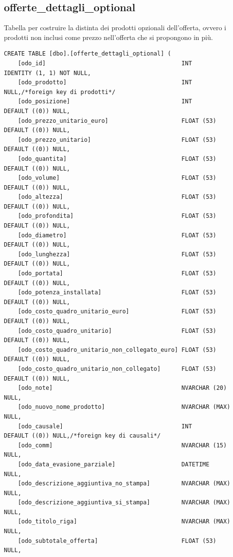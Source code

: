 \documentclass[12pt]{article}
\begin{document}
\subsection{offerte\_dettagli\_optional}
Tabella per costruire la distinta dei prodotti opzionali dell'offerta,
ovvero i prodotti non inclusi come prezzo nell'offerta che si propongono in più.
\begin{lstlisting}
CREATE TABLE [dbo].[offerte_dettagli_optional] (
    [odo_id]                                       INT            IDENTITY (1, 1) NOT NULL,
    [odo_prodotto]                                 INT            NULL,/*foreign key di prodotti*/
    [odo_posizione]                                INT            DEFAULT ((0)) NULL,
    [odo_prezzo_unitario_euro]                     FLOAT (53)     DEFAULT ((0)) NULL,
    [odo_prezzo_unitario]                          FLOAT (53)     DEFAULT ((0)) NULL,
    [odo_quantita]                                 FLOAT (53)     DEFAULT ((0)) NULL,
    [odo_volume]                                   FLOAT (53)     DEFAULT ((0)) NULL,
    [odo_altezza]                                  FLOAT (53)     DEFAULT ((0)) NULL,
    [odo_profondita]                               FLOAT (53)     DEFAULT ((0)) NULL,
    [odo_diametro]                                 FLOAT (53)     DEFAULT ((0)) NULL,
    [odo_lunghezza]                                FLOAT (53)     DEFAULT ((0)) NULL,
    [odo_portata]                                  FLOAT (53)     DEFAULT ((0)) NULL,
    [odo_potenza_installata]                       FLOAT (53)     DEFAULT ((0)) NULL,
    [odo_costo_quadro_unitario_euro]               FLOAT (53)     DEFAULT ((0)) NULL,
    [odo_costo_quadro_unitario]                    FLOAT (53)     DEFAULT ((0)) NULL,
    [odo_costo_quadro_unitario_non_collegato_euro] FLOAT (53)     DEFAULT ((0)) NULL,
    [odo_costo_quadro_unitario_non_collegato]      FLOAT (53)     DEFAULT ((0)) NULL,
    [odo_note]                                     NVARCHAR (20)  NULL,
    [odo_nuovo_nome_prodotto]                      NVARCHAR (MAX) NULL,
    [odo_causale]                                  INT            DEFAULT ((0)) NULL,/*foreign key di causali*/
    [odo_comm]                                     NVARCHAR (15)  NULL,
    [odo_data_evasione_parziale]                   DATETIME       NULL,
    [odo_descrizione_aggiuntiva_no_stampa]         NVARCHAR (MAX) NULL,
    [odo_descrizione_aggiuntiva_si_stampa]         NVARCHAR (MAX) NULL,
    [odo_titolo_riga]                              NVARCHAR (MAX) NULL,
    [odo_subtotale_offerta]                        FLOAT (53)     NULL,

\end{lstlisting}
\end{document}

